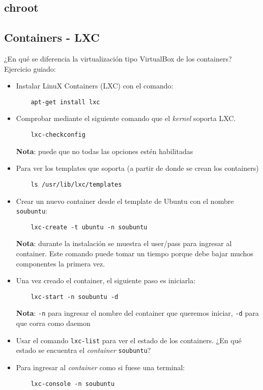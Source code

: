 \subsection{chroot}

\subsection{Containers - LXC}
\begin{questions}
\question ¿En qué se diferencia la virtualización tipo VirtualBox de los containers?
\question Ejercicio guiado:

\begin{itemize}
\item Instalar LinuX Containers (LXC) con el comando:
\begin{verbatim}
  	apt-get install lxc
\end{verbatim}
\item Comprobar mediante el siguiente comando que el \textit{kernel} soporta LXC.
\begin{verbatim}
  	lxc-checkconfig
\end{verbatim}
  \textbf{Nota}: puede que no todas las opciones estén habilitadas
\item Para ver los templates que soporta (a partir de donde se crean los containers)
\begin{verbatim}
  	ls /usr/lib/lxc/templates
\end{verbatim}
\item Crear un nuevo container desde el template de Ubuntu con el nombre
  \texttt{soubuntu}:
\begin{verbatim}
  	lxc-create -t ubuntu -n soubuntu
\end{verbatim}
  \textbf{Nota}: durante la instalación se muestra el user/pass para
  ingresar al container. Este comando puede tomar un tiempo porque debe
  bajar muchos componentes la primera vez.
\item Una vez creado el container, el siguiente paso es iniciarla:
\begin{verbatim}
  	lxc-start -n soubuntu -d
\end{verbatim}
  \textbf{Nota}: \texttt{-n} para ingresar el nombre del container que
  queremos iniciar, \texttt{-d} para que corra como daemon
\item Usar el comando \texttt{lxc-list} para ver el estado de los
  containers. ¿En qué estado se encuentra el \textit{container}
  \texttt{soubuntu}?
\item Para ingresar al \textit{container} como si fuese una terminal:
\begin{verbatim}
  	lxc-console -n soubuntu
\end{verbatim}
  

\end{itemize}
\end{questions}
